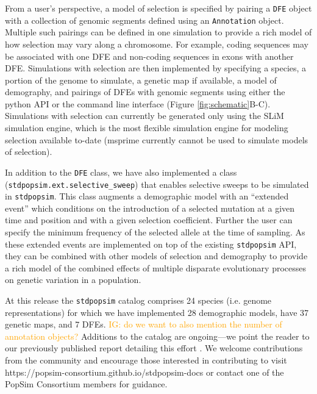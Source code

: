 \documentclass[hidelinks]{article}
\newcommand{\stdpopsim}{\texttt{stdpopsim}\xspace}
\newcommand{\igcomment}[1]{\textcolor{orange}{IG: #1}}
\begin{document}
  
    From a user's perspective, a model of selection is specified by pairing a \texttt{DFE} object
    with a collection of genomic segments defined using an \texttt{Annotation} object.
    Multiple such pairings can be defined in one simulation
    to provide a rich model of how selection may vary along a chromosome.
    For example, coding sequences may be associated with one DFE and non-coding sequences in exons with another DFE.
    Simulations with selection are then implemented by specifying a species, 
    a portion of the genome to simulate,
    a genetic map if available, a model of demography, and pairings of DFEs with genomic segments
    using either the python API or the command line interface (Figure \ref{fig:schematic}B-C).
    Simulations with selection can currently be generated only 
    using the SLiM simulation engine, which is
    the most flexible simulation engine for modeling selection available to-date
    (msprime currently cannot be used to simulate models of selection).

    In addition to the \texttt{DFE} class, we have also implemented a class (\texttt{stdpopsim.ext.selective\_sweep})
    that enables selective sweeps to be simulated in \stdpopsim.
    This class augments a demographic model with an ``extended event''
    which conditions on the introduction of a selected mutation at a given time and position
    and with a given selection coefficient. Further the user can specify the minimum frequency
    of the selected allele at the time of sampling. As these extended events are implemented
    on top of the existing \stdpopsim API, they can be combined with other models of selection
    and demography to provide a rich model of the combined effects of multiple disparate evolutionary processes
    on genetic variation in a population.
    

    At this release the \stdpopsim catalog comprises 24 species (i.e. genome representations)
    for which we have implemented 28 demographic models, have 37 genetic maps, and 7 DFEs. %
    \igcomment{do we want to also mention the number of annotation objects?}
    Additions to the catalog are ongoing---we point the reader to our previously published 
    report detailing this effort \citep{lauterbur2023expanding}. We welcome contributions from the
    community and encourage those interested in contributing to visit https://popsim-consortium.github.io/stdpopsim-docs
    or contact one of the PopSim Consortium members for guidance.
\end{document}
